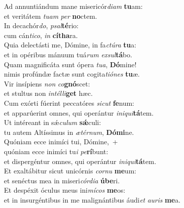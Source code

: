 \evenverse Ad annuntiándum mane misericór\textit{di}\textit{am} \textbf{tu}am:~\*\\
\evenverse et veritátem \textit{tu}\textit{am} \textit{per} \textbf{no}ctem.\\
\oddverse In decachór\textit{do}, \textit{psal}\textbf{té}rio:~\*\\
\oddverse cum cán\textit{ti}\textit{co}, \textit{in} \textbf{cí}\textbf{tha}ra.\\
\evenverse Quia delectásti me, Dómine, in fa\textit{ctú}\textit{ra} \textbf{tu}a:~\*\\
\evenverse et in opéribus mánuum tuá\textit{rum} \textit{ex}\textit{sul}\textbf{tá}bo.\\
\oddverse Quam magnificáta sunt ópera \textit{tu}\textit{a}, \textbf{Dó}mine!~\*\\
\oddverse nimis profúndæ factæ sunt cogita\textit{ti}\textit{ó}\textit{nes} \textbf{tu}æ.\\
\evenverse Vir insípiens \textit{non} \textit{co}\textbf{gnó}scet:~\*\\
\evenverse et stultus non \textit{in}\textit{tél}\textit{li}\textbf{get} hæc.\\
\oddverse Cum exórti fúerint peccatóres \textit{si}\textit{cut} \textbf{fe}num:~\*\\
\oddverse et apparúerint omnes, qui operántur \textit{i}\textit{ni}\textit{qui}\textbf{tá}tem.\\
\evenverse Ut intéreant in sǽ\textit{cu}\textit{lum} \textbf{sǽ}culi:~\*\\
\evenverse tu autem Altíssimus in \textit{æ}\textit{tér}\textit{num}, \textbf{Dó}\textbf{mi}ne.\\
\oddverse Quóniam ecce inimíci tui, Dómine,~+\\
\oddverse  quóniam ecce inimíci tu\textit{i} \textit{pe}\textbf{rí}bunt:~\*\\
\oddverse et dispergéntur omnes, qui operántur \textit{i}\textit{ni}\textit{qui}\textbf{tá}tem.\\
\evenverse Et exaltábitur sicut unicórnis \textit{cor}\textit{nu} \textbf{me}um:~\*\\
\evenverse et senéctus mea in miseri\textit{cór}\textit{di}\textit{a} \textbf{ú}\textbf{be}ri.\\
\oddverse Et despéxit óculus meus ini\textit{mí}\textit{cos} \textbf{me}os:~\*\\
\oddverse et in insurgéntibus in me malignántibus áudi\textit{et} \textit{au}\textit{ris} \textbf{me}a.\\
